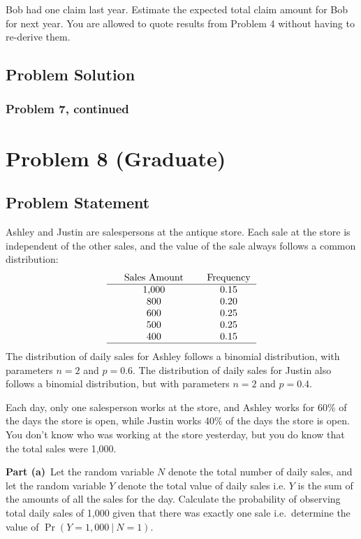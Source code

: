 \documentclass[12pt]{article}
\theoremstyle{definition}
\begin{document}
\bigskip
Bob had one claim last year. Estimate the expected total claim amount for Bob for next year. You are allowed to quote results from Problem 4 without having to re-derive them.


\subsection*{Problem Solution}



\newpage
\subsubsection*{Problem 7, continued}






\newpage
\section*{Problem 8 (Graduate)}


\subsection*{Problem Statement}

Ashley and Justin are salespersons at the antique store. Each sale at the store is independent of the other sales, and the value of the sale always follows a common distribution:
$$
\begin{tabular}{ccccc}
&  Sales Amount & & Frequency\\
\hline
& 1,000 & & 0.15\\
& 800 & & 0.20\\
& 600 & & 0.25\\
& 500 & & 0.25\\
& 400 & & 0.15\\
\hline
\end{tabular}
$$
The distribution of daily sales for Ashley follows a binomial distribution, with parameters $n = 2$ and $p = 0.6$. The distribution of daily sales for Justin also follows a binomial distribution, but with parameters $n = 2$ and $p = 0.4$.

\bigskip
Each day, only one salesperson works at the store, and Ashley works for 60\% of the days the store is open, while Justin works 40\% of the days the store is open. You don't know who was working at the store yesterday, but you do know that the total sales were 1,000. 

\bigskip
\noindent
{\bf Part (a)}\ Let the random variable $N$ denote the total number of daily sales, and let the random variable $Y$ denote the total value of daily sales i.e. $Y$ is the sum of the amounts of all the sales for the day. Calculate the probability of observing total daily sales of 1,000 given that there was exactly one sale i.e.\ determine the value of $\Pr(Y = 1,000\ |\ N = 1)$.
\end{document}
